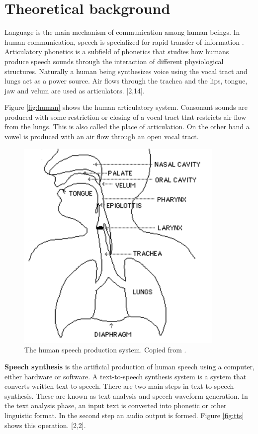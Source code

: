 \documentclass[11pt,a4paper,oneside,article]{memoir}
\begin{document}
\clearpage	
\chapter{Theoretical background}
Language is the main mechanism of communication among human beings. In human communication, speech is specialized for rapid transfer of information \cite{vocal}. Articulatory phonetics is a subfield of phonetics that studies how humans produce speech sounds through the interaction of different physiological structures. Naturally a human being synthesizes voice using the vocal tract and lungs act as a power source. Air flows through the trachea and the lips, tongue, jaw and velum are used as articulators. [2,14].

Figure \vref{fig:human} shows the human articulatory system. Consonant sounds are produced with some restriction or closing of a vocal tract that restricts air flow from the lungs. This is also called the place of articulation. On the other hand a vowel is produced with an air flow through an open vocal tract.

\begin{figure}[h]
  \includegraphics[width=10cm]{human}
  \caption{The human speech production system. Copied from \cite{vocal}.}
  \label{fig:human}
\end{figure}

\newpage
\textbf{Speech synthesis} is the artificial production of human speech using a computer, either hardware or software. A text-to-speech synthesis system is a system that converts written text-to-speech. There are two main steps in text-to-speech-synthesis. These are known as text analysis and speech waveform generation. In the text analysis phase, an input text is converted into phonetic or other linguistic format. In the second step an audio output is formed. Figure \vref{fig:tts} shows this operation. [2,2].
\end{document}
